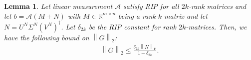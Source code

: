 \documentclass[11pt]{article}
\theoremstyle{plain}
\newtheorem{lemma}[theorem]{Lemma}
\theoremstyle{definition}
\newcommand{\rmn}{\mathbb{R}^{m \times n}}
\newcommand{\frob}[1]{\left\| {#1} \right\|_\text{F}}
\newcommand{\twonorm}[1]{\left\| {#1} \right\|_2}
\newcommand{\aff}{{\mathcal A}}
\newcommand{\Un}{U^N}
\newcommand{\Vn}{V^N}
\newcommand{\Sn}{\Sigma^N}
\begin{document}
\begin{lemma}\label{lemma:sensing-twonorm-G-noisycase}
Let linear measurement $\aff$ satisfy RIP for all  $2k$-rank matrices and let $b=\aff(M+N)$ with $M\in \rmn$ being a rank-$k$ matrix and let $N=\Un\Sn (\Vn)^\dag$.  Let $\delta_{2k}$ be the RIP constant for rank $2k$-matrices. Then, we have the following bound on $\twonorm{G}$:
\begin{align}\label{eqn:sensing-twonorm-G-noisycase}
    \twonorm{G} \leq \frac{\delta_{2k} \frob{N}}{1-\delta_{2k}}.
\end{align}
\end{lemma}
\end{document}
